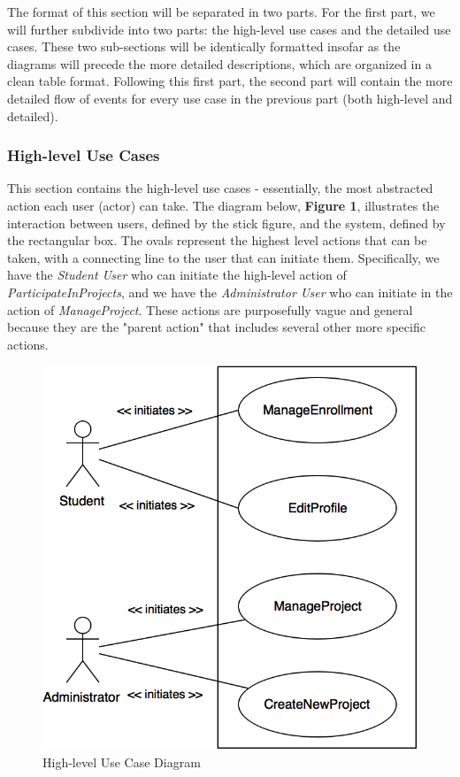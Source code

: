 \documentclass[12pt,letterpaper]{article}
\begin{document}
The format of this section will be separated in two parts. For the first part, we will further subdivide into two parts: the high-level use cases and the detailed use cases. 
These two sub-sections will be identically formatted insofar as the diagrams will precede the more detailed descriptions, which are organized in a clean table format. Following
this first part, the second part will contain the more detailed flow of events for every use case in the previous part (both high-level and detailed).

\subsubsection*{High-level Use Cases}

This section contains the high-level use cases - essentially, the most abstracted action each user (actor) can take. The diagram below, {\bf Figure 1}, illustrates the interaction between
users, defined by the stick figure, and the system, defined by the rectangular box. The ovals represent the highest level actions that can be taken, with a connecting line to
the user that can initiate them. Specifically, we have the {\it Student User} who can initiate the high-level action of {\it ParticipateInProjects}, and we have the {\it Administrator User} 
who can initiate in the action of {\it ManageProject}. These actions are purposefully vague and general because they are the "parent action" that includes several other more specific actions.
\vspace{1em}

\begin{figure}[H]
	\centering{}
	\includegraphics[scale=0.3]{imgs/high-level-use-case-diagram.png}
	\caption{High-level Use Case Diagram}
\end{figure}
\end{document}
